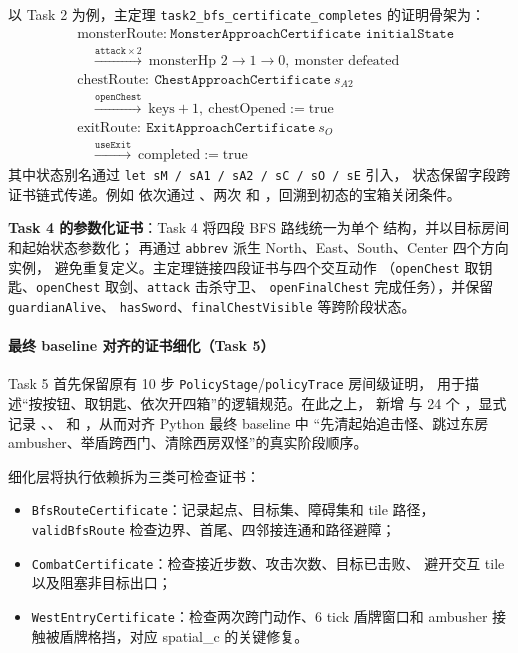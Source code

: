 \documentclass[12pt,a4paper]{ctexart}
\begin{document}
以 Task 2 为例，主定理 \texttt{task2\_bfs\_certificate\_completes} 的证明骨架为：
\[
\begin{aligned}
&\text{monsterRoute}:\ \texttt{MonsterApproachCertificate initialState}\\
&\quad \xrightarrow{\texttt{attack}\times 2}\ \text{monsterHp } 2\to 1\to 0,\ \text{monster defeated}\\
&\text{chestRoute}:\ \texttt{ChestApproachCertificate}\ s_{A2}\\
&\quad \xrightarrow{\texttt{openChest}}\ \text{keys}+1,\ \text{chestOpened}:=\text{true}\\
&\text{exitRoute}:\ \texttt{ExitApproachCertificate}\ s_{O}\\
&\quad \xrightarrow{\texttt{useExit}}\ \text{completed}:=\text{true}
\end{aligned}
\]
其中状态别名通过 \texttt{let sM / sA1 / sA2 / sC / sO / sE} 引入，
状态保留字段跨证书链式传递。例如  依次通过
、两次
 和
，回溯到初态的宝箱关闭条件。

\textbf{Task 4 的参数化证书}：Task 4 将四段 BFS 路线统一为单个
 结构，并以目标房间和起始状态参数化；
再通过 \texttt{abbrev} 派生 North、East、South、Center 四个方向实例，
避免重复定义。主定理链接四段证书与四个交互动作
（\texttt{openChest} 取钥匙、\texttt{openChest} 取剑、\texttt{attack} 击杀守卫、
\texttt{openFinalChest} 完成任务），并保留 \texttt{guardianAlive}、
\texttt{hasSword}、\texttt{finalChestVisible} 等跨阶段状态。

\paragraph{最终 baseline 对齐的证书细化（Task 5）}
Task 5 首先保留原有 10 步 \texttt{PolicyStage}/\texttt{policyTrace} 房间级证明，
用于描述“按按钮、取钥匙、依次开四箱”的逻辑规范。在此之上，
新增  与 24 个 ，显式记录
、、
 和 ，从而对齐 Python 最终 baseline 中
“先清起始追击怪、跳过东房 ambusher、举盾跨西门、清除西房双怪”的真实阶段顺序。

细化层将执行依赖拆为三类可检查证书：
\begin{itemize}[leftmargin=2em]
  \item \texttt{BfsRouteCertificate}：记录起点、目标集、障碍集和 tile 路径，
  \texttt{validBfsRoute} 检查边界、首尾、四邻接连通和路径避障；
  \item \texttt{CombatCertificate}：检查接近步数、攻击次数、目标已击败、
  避开交互 tile 以及阻塞非目标出口；
  \item \texttt{WestEntryCertificate}：检查两次跨门动作、6 tick 盾牌窗口和
  ambusher 接触被盾牌格挡，对应 spatial\_c 的关键修复。
\end{itemize}
\end{document}
